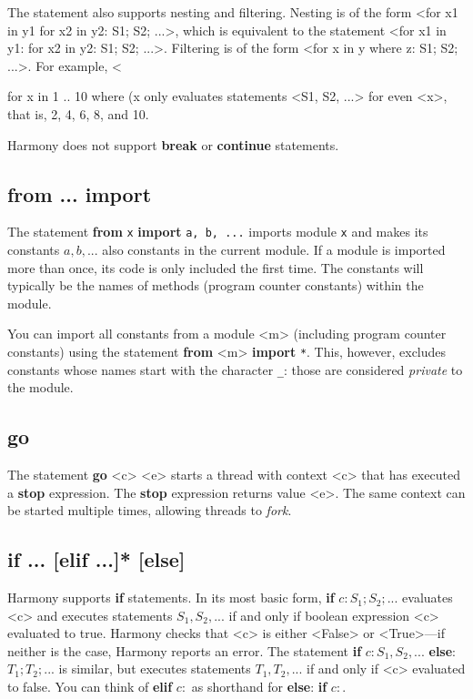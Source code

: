 \documentclass{report}
\begin{document}
The statement also supports nesting and filtering.
Nesting is of the form
<{for x1 in y1 for x2 in y2: S1; S2; ...}>,
which is equivalent to the statement
<{for x1 in y1: for x2 in y2: S1; S2; ...}>.
Filtering is of the form
<{for x in y where z: S1; S2; ...}>.
For example,
<{for x in 1 .. 10 where (x %
only evaluates statements <{S1, S2, ...}> for even <{x}>,
that is, 2, 4, 6, 8, and 10.

Harmony does not support \textbf{break} or \textbf{continue} statements.

\subsection*{\textbf{from ... import}}

The statement \textbf{from} \texttt{x} \textbf{import} \texttt{a, b, ...}
imports module \texttt{x} and makes its constants $a, b, ...$ also constants
in the current module.  If a module is imported more than once, its code
is only included the first time.  The constants will typically be the
names of methods (program counter constants) within the module.

You can import all constants from a module <{m}>
(including program counter constants) using the statement
\textbf{from} <{m}> \textbf{import} \texttt{*}.
This, however, excludes constants whose names start with the character
\texttt{\_}: those are considered \emph{private} to the module.

\subsection*{\textbf{go}}

The statement \textbf{go} <{c}> <{e}> starts a thread with context <{c}> that
has executed a \textbf{stop} expression.  The \textbf{stop} expression
returns value <{e}>.
The same context can be started multiple times, allowing threads to
\emph{fork}.

\subsection*{\textbf{if ... [elif ...]* [else]}}

Harmony supports \textbf{if} statements.
In its most basic form, \textbf{if} $c: S_1; S_2; ...$ evaluates <{c}>
and executes statements $S_1, S_2, ...$ if and only if boolean expression
<{c}> evaluated to true.
Harmony checks that <{c}> is either <{False}> or <{True}>---if neither
is the case, Harmony reports an error.
The statement \textbf{if} $c: S_1, S_2, ...$ \textbf{else}:
$T_1; T_2; ...$ is similar, but executes statements $T_1, T_2, ...$
if and only if <{c}> evaluated to false.
You can think of \textbf{elif} $c:$ as shorthand for
\textbf{else}: \textbf{if} $c:$.

}
\end{document}
